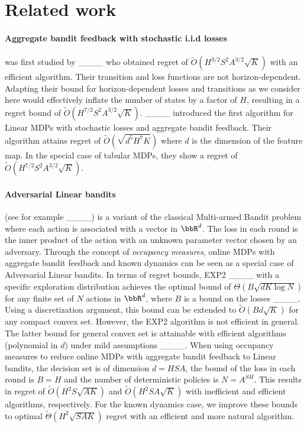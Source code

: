 \section{Related work}
\paragraph{\bf Aggregate bandit feedback with stochastic i.i.d losses\hspace{-0.5em}} was first studied by ____ who obtained regret of $\tilde O(H^{3/2}S^2 A^{3/2} \sqrt{K})$ with an efficient algorithm. Their transition and loss functions are not horizon-dependent. Adapting their bound for horizon-dependent losses and transitions as we consider here would effectively inflate the number of states by a factor of $H$, resulting in a regret bound of $\tilde O(H^{7/2} S^2 A^{3/2} \sqrt{K})$. ____ introduced the first algorithm for Linear MDPs with stochastic losses and aggregate bandit feedback. Their algorithm attains regret of $\tilde O(\sqrt{d^5 H^7 K})$ where $d$ is the dimension of the feature map. In the special case of tabular MDPs, they show a regret of $\tilde O (H^{7/2} S^2 A^{3/2} \sqrt{K})$.

\paragraph{\bf Adversarial Linear bandits\hspace{-0.5em}} (see for example ____) is a variant of the classical Multi-armed Bandit problem where each action is associated with a vector in $\bbR^d$. The loss in each round is the inner product of the action with an unknown parameter vector chosen by an adversary. Through the concept of \textit{occupancy measures}, online MDPs with aggregate bandit feedback and known dynamics can be seen as a special case of Adversarial Linear bandits. In terms of regret bounds,
EXP2 ____ with a specific exploration distribution achieves the optimal bound of $\Theta(B \sqrt {dK \log N})$ for any finite set of $N$ actions in $\bbR^d$, where $B$ is a bound on the losses ____. 
Using a discretization argument, this bound can be extended to $\tilde O(B d \sqrt{K})$ for any compact convex set. However, the EXP2 algorithm is not efficient in general.
% 
The latter bound for general convex set is attainable with efficient algorithms (polynomial in $d$) under mild assumptions ____. When using occupancy measures to reduce online MDPs with aggregate bandit feedback to Linear bandits, the decision set is of dimension $d = HSA$, the bound of the loss in each round is $B=H$ and the number of deterministic policies is $N = A^{SH}$. This results in regret of $\tilde O(H^2 S \sqrt{A K})$ and $\tilde O(H^2 S A \sqrt{K})$ with inefficient and efficient algorithms, respectively. For the known dynamics case, we improve these bounds to optimal $\tilde \Theta(H^2  \sqrt{S A K})$ regret with an efficient and more natural algorithm.

